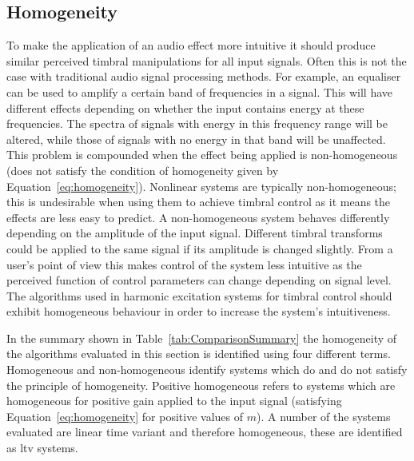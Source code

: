 	\subsection{Homogeneity}
	\label{sec:ExcitationEvaluation-Evaluation-Homogeneity}
		To make the application of an audio effect more intuitive it should produce similar perceived timbral
		manipulations for all input signals. Often this is not the case with traditional audio signal processing
		methods. For example, an equaliser can be used to amplify a certain band of frequencies in a signal. This
		will have different effects depending on whether the input contains energy at these frequencies. The
		spectra of signals with energy in this frequency range will be altered, while those of signals with no
		energy in that band will be unaffected. This problem is compounded when the effect being applied is
		non-homogeneous (does not satisfy the condition of homogeneity given by Equation~\ref{eq:homogeneity}).
		Nonlinear systems are typically non-homogeneous; this is undesirable when using them to achieve timbral
		control as it means the effects are less easy to predict. A non-homogeneous system behaves differently
		depending on the amplitude of the input signal. Different timbral transforms could be applied to the same
		signal if its amplitude is changed slightly. From a user's point of view this makes control of the system
		less intuitive as the perceived function of control parameters can change depending on signal level. The
		algorithms used in harmonic excitation systems for timbral control should exhibit homogeneous behaviour in
		order to increase the system's intuitiveness.

		In the summary shown in Table~\ref{tab:ComparisonSummary} the homogeneity of the algorithms evaluated in
		this section is identified using four different terms. Homogeneous and non-homogeneous identify systems
		which do and do not satisfy the principle of homogeneity. Positive homogeneous refers to systems which are
		homogeneous for positive gain applied to the input signal (satisfying Equation~\ref{eq:homogeneity} for
		positive values of $m$). A number of the systems evaluated are linear time variant and therefore
		homogeneous, these are identified as \acrshort{ltv} systems.

